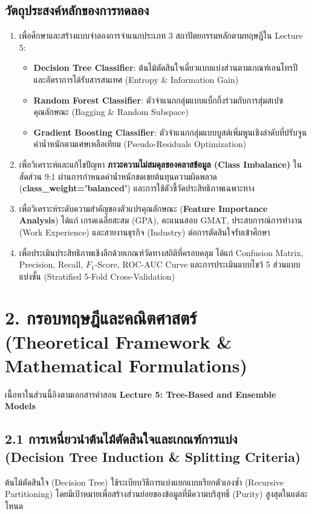 \documentclass[12pt,a4paper]{article}
\newcommand{\codevar}[1]{\textcolor{codeaccent}{\textbf{#1}}}
\begin{document}
\subsection*{วัตถุประสงค์หลักของการทดลอง}
\begin{enumerate}[leftmargin=18pt, itemsep=2pt]
    \item เพื่อศึกษาและสร้างแบบจำลองการจำแนกประเภท 3 สถาปัตยกรรมหลักตามทฤษฎีใน Lecture 5:
    \begin{itemize}
        \item \textbf{Decision Tree Classifier}: ต้นไม้ตัดสินใจเดี่ยวแบบแบ่งส่วนตามเกณฑ์เอนโทรปีและอัตราการได้รับสารสนเทศ (Entropy \& Information Gain)
        \item \textbf{Random Forest Classifier}: ตัวจำแนกกลุ่มแบบแบ็กกิ้งร่วมกับการสุ่มสเปซคุณลักษณะ (Bagging \& Random Subspace)
        \item \textbf{Gradient Boosting Classifier}: ตัวจำแนกกลุ่มแบบบูสต์เพิ่มพูนเชิงลำดับที่ปรับจูนค่าน้ำหนักตามเศษเหลือเทียม (Pseudo-Residuals Optimization)
    \end{itemize}
    \item เพื่อวิเคราะห์และแก้ไขปัญหา \textbf{ภาวะความไม่สมดุลของคลาสข้อมูล (Class Imbalance)} ในสัดส่วน 9:1 ผ่านการกำหนดค่าน้ำหนักชดเชยต้นทุนความผิดพลาด (\codevar{class\_weight='balanced'}) และการใช้ตัวชี้วัดประสิทธิภาพเฉพาะทาง
    \item เพื่อวิเคราะห์ระดับความสำคัญของตัวแปรคุณลักษณะ (\textbf{Feature Importance Analysis}) ได้แก่ เกรดเฉลี่ยสะสม (GPA), คะแนนสอบ GMAT, ประสบการณ์การทำงาน (Work Experience) และสายงานธุรกิจ (Industry) ต่อการตัดสินใจรับเข้าศึกษา
    \item เพื่อประเมินประสิทธิภาพเชิงลึกด้วยเกณฑ์วัดทางสถิติที่ครอบคลุม ได้แก่ Confusion Matrix, Precision, Recall, $F_1$-Score, ROC-AUC Curve และการประเมินแบบไขว้ 5 ส่วนแบบแบ่งชั้น (Stratified 5-Fold Cross-Validation)
\end{enumerate}

\section*{2. กรอบทฤษฎีและคณิตศาสตร์\\ \large(Theoretical Framework \& Mathematical Formulations)}

เนื้อหาในส่วนนี้อิงตามเอกสารคำสอน \textbf{Lecture 5: Tree-Based and Ensemble Models}

\subsection*{2.1 การเหนี่ยวนำต้นไม้ตัดสินใจและเกณฑ์การแบ่ง\\ \normalsize(Decision Tree Induction \& Splitting Criteria)}
ต้นไม้ตัดสินใจ (Decision Tree) ใช้ระเบียบวิธีการแบ่งแยกแบบเรียกตัวเองซ้ำ (Recursive Partitioning) โดยมีเป้าหมายเพื่อสร้างส่วนย่อยของข้อมูลที่มีความบริสุทธิ์ (Purity) สูงสุดในแต่ละโหนด
\end{document}
